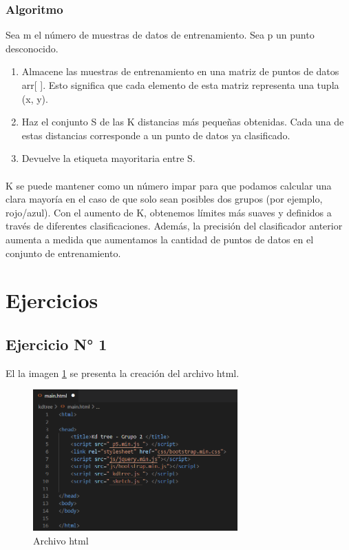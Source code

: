 \documentclass{article}
\begin{document}
\subsubsection{Algoritmo}
Sea m el número de muestras de datos de entrenamiento. Sea p un punto desconocido.

\begin{enumerate}
	\item Almacene las muestras de entrenamiento en una matriz de puntos de datos arr[ ]. Esto significa que cada elemento de esta matriz representa una tupla (x, y).
	\item Haz el conjunto S de las K distancias más pequeñas obtenidas. Cada una de estas distancias corresponde a un punto de datos ya clasificado.
	\item Devuelve la etiqueta mayoritaria entre S.
\end{enumerate}

\paragraph{}
K se puede mantener como un número impar para que podamos calcular una clara mayoría en el caso de que solo sean posibles dos grupos (por ejemplo, rojo/azul). Con el aumento de K, obtenemos límites más suaves y definidos a través de diferentes clasificaciones. Además, la precisión del clasificador anterior aumenta a medida que aumentamos la cantidad de puntos de datos en el conjunto de entrenamiento.

\section{Ejercicios}

\subsection{Ejercicio N° 1}
El la imagen \ref{fig:ejercicio_01} se presenta la creación del archivo html.
\begin{figure}[h!]
	\centering
	\includegraphics[width=0.7\textwidth]{img/ejercicio_01.png}
	\caption{Archivo html}
	\label{fig:ejercicio_01}
\end{figure}
\end{document}
